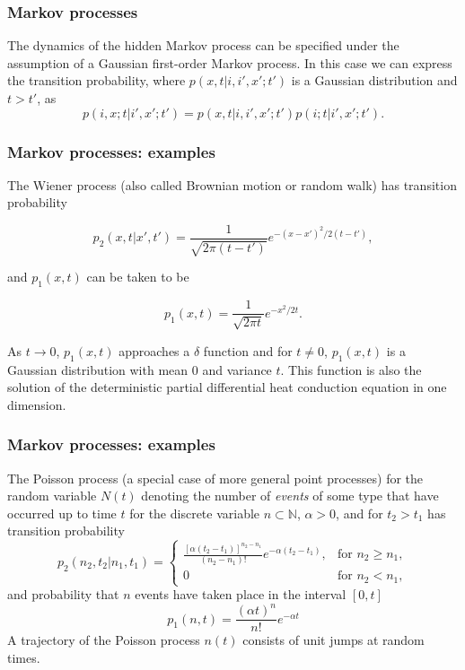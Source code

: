 \begin{frame}
\frametitle{Markov processes}
The dynamics of the hidden Markov process can be specified under the assumption of a Gaussian first-order Markov process. In this case we can express the transition probability, where $p(x,t|i,i',x';t')$ is a Gaussian distribution and $t > t'$, as
$$
p(i,x;t|i',x';t')=p(x,t|i,i',x';t')p(i;t|i',x';t').
$$
\end{frame}

\begin{frame}
\frametitle{Markov processes: examples}
The Wiener process (also called Brownian motion or random walk) has transition probability

$$
p_2(x,t|x',t')=\frac{1}{\sqrt{2 \pi (t-t')}} e^{-(x-x')^2/2(t-t')},
$$

and $p_1(x,t)$ can be taken to be

$$
p_1(x,t) = \frac{1}{\sqrt{2 \pi t}} e^{-x^2/2t}.
$$

As $t \rightarrow 0$, $p_1(x,t)$ approaches a $\delta$ function and for $t \neq 0$, $p_1(x,t)$ is a Gaussian distribution with mean $0$ and variance $t$. This function is also the solution of the deterministic partial differential heat conduction equation in one dimension.
\end{frame}

\begin{frame}
\frametitle{Markov processes: examples}
The Poisson process (a special case of more general point processes) for the random variable $N(t)$ denoting the number of \emph{events} of some type that have occurred up to time $t$ for the discrete variable $n \subset \mathbb{N}$, $\alpha > 0$, and for $t_2 > t_1$ has transition probability 
$$
p_2(n_2,t_2|n_1,t_1) = 
\begin{cases}
\frac{[\alpha (t_2 - t_1)]^{n_2 - n_1}}{(n_2 - n_1)!} e^{-\alpha (t_2 - t_1)}, & \text{for $n_2 \geq n_1$},\\
0 & \text{for $n_2 < n_1$},
\end{cases}
$$
and probability that $n$ events have taken place in the interval $[0,t]$
$$
p_1(n,t) = \frac{(\alpha t)^n}{n!} e^{-\alpha t}
$$
A trajectory of the Poisson process $n(t)$ consists of unit jumps at random times. 
\end{frame}

